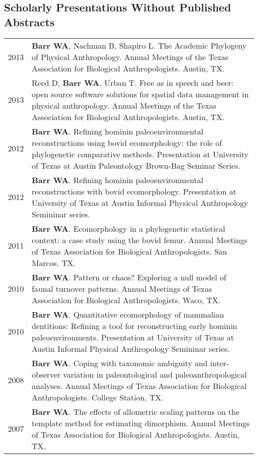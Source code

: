 \documentclass{article}
\begin{document}
\subsection*{Scholarly Presentations Without Published Abstracts}


\begin{longtable}{p{}p{}}
2013 & {\bfseries Barr WA}, Nachman B, Shapiro L. The Academic Phylogeny of Physical Anthropology. Annual Meetings of the Texas Association for Biological Anthropologists. Austin, TX.\\[4pt]

2013 & Reed D, {\bfseries Barr WA}, Urban T. Free as in speech and beer: open source software solutions for spatial data management in physical anthropology. Annual Meetings of the Texas Association for Biological Anthropologists. Austin, TX.\\[4pt]

2012 & {\bfseries Barr WA}. Refining hominin paleoenvironmental reconstructions using bovid ecomorphology: the role of phylogenetic comparative methods. Presentation at University of Texas at Austin Paleontology Brown-Bag Seminar Series.\\[4pt]

2012 & {\bfseries Barr WA}. Refining hominin paleoenvironmental reconstructions with bovid ecomorphology. Presentation at University of Texas at Austin Informal Physical Anthropology Semininar series.\\[4pt]

2011 & {\bfseries Barr WA}. Ecomorphology in a phylogenetic statistical context: a case study using the bovid femur. Annual Meetings of Texas Association for Biological Anthropologists. San Marcos, TX.\\[4pt]

2010 & {\bfseries Barr WA}. Pattern or chaos? Exploring a null model of faunal turnover patterns. Annual Meetings of Texas Association for Biological Anthropologists. Waco, TX.\\[4pt]

2010 & {\bfseries Barr WA}. Quantitative ecomorphology of mammalian dentitions: Refining a tool for reconstructing early hominin paleoenvironments. Presentation at University of Texas at Austin Informal Physical Anthropology Semininar series.\\[4pt]

2008 & {\bfseries Barr WA}. Coping with taxonomic ambiguity and inter-observer variation in paleontological and paleoanthropological analyses. Annual Meetings of Texas Association for Biological Anthropologists. College Station, TX.\\[4pt]

2007 & {\bfseries Barr WA}. The effects of allometric scaling patterns on the template method for estimating dimorphism. Annual Meetings of Texas Association for Biological Anthropologists. Austin, TX.\\
\end{longtable}
\end{document}
